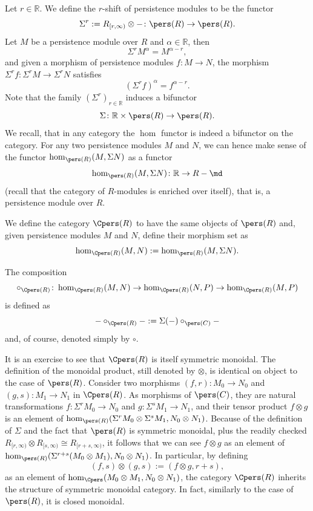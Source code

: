 Let $r\in \mathbb{R}$. We define the $r$-shift of persistence modules to be the functor $$\Sigma^r:=R_{[r,\infty)}\otimes -\colon\pers(R)\to \pers(R).$$ Let $M$ be a persistence module over $R$ and $\alpha\in \mathbb{R}$, then $$\Sigma^rM^\alpha = M^{\alpha-r},$$ and given a morphism of persistence modules $f\colon M\to N$, the morphism $\Sigma^rf\colon \Sigma^rM\to \Sigma^rN$ satisfies $$(\Sigma^rf)^{\alpha}=f^{\alpha-r}.$$ Note that the family $(\Sigma^r)_{r\in \mathbb{R}}$ induces a bifunctor $$\Sigma\colon \mathbb{R}\times \pers(R)\to \pers(R).$$ We recall, that in any category the $\hom$ functor is indeed a bifunctor on the category. For any two persistence modules $M$ and $N$, we can hence make sense of the functor $\hom_{\pers(R)}(M,\Sigma N)$ as a functor $$\hom_{\pers(R)}(M,\Sigma N)\colon \mathbb{R} \to R-\md$$ (recall that the category of $R$-modules is enriched over itself), that is, a persistence module over $R$.

We define the category $\Cpers(R)$ to have the same objects of $\pers(R)$ and, given persistence modules $M$ and $N$, define their morphism set as $$\hom_{\Cpers(R)}(M,N):=\hom_{\pers(R)}(M,\Sigma N).$$

The composition $$\circ_{\Cpers(R)} \colon \hom_{\Cpers(R)}(M,N)\to \hom_{\Cpers(R)}(N,P)\to \hom_{\Cpers(R)}(M,P)$$ is defined as $$-\circ_{\Cpers(R)}-:= \Sigma(-)\circ_{\pers(C)} -$$ and, of course, denoted simply by $\circ$.

It is an exercise to see that $\Cpers(R)$ is itself symmetric monoidal. The definition of the monoidal product, still denoted by $\otimes$, is identical on object to the case of $\pers(R)$. Consider two morphisms $(f,r)\colon M_0\to N_0$ and $(g,s)\colon M_1\to N_1$ in $\Cpers(R)$. As morphisms of $\pers(C)$, they are natural transformations $f\colon \Sigma^rM_0\to N_0$ and $g\colon \Sigma^sM_1\to N_1$, and their tensor product $f\otimes g$ is an element of $\hom_{\pers(R)}(\Sigma^rM_0\otimes \Sigma^sM_1,N_0\otimes N_1)$. Because of the definition of $\Sigma$ and the fact that $\pers(R)$ is symmetric monoidal, plus the readily checked $R_{[r,\infty)}\otimes R_{[s,\infty)}\cong R_{[r+s,\infty)}$, it follows that we can see $f\otimes g$ as an element of $\hom_{\pers(R)}(\Sigma^{r+s}(M_0\otimes M_1),N_0\otimes N_1)$. In particular, by defining $$(f,s)\otimes (g,s):= (f\otimes g, r+s),$$ as an element of $\hom_{\Cpers}(M_0\otimes M_1,N_0\otimes N_1)$, the category $\Cpers(R)$ inherits the structure of symmetric monoidal category. In fact, similarly to the case of $\pers(R)$, it is closed monoidal.\\

